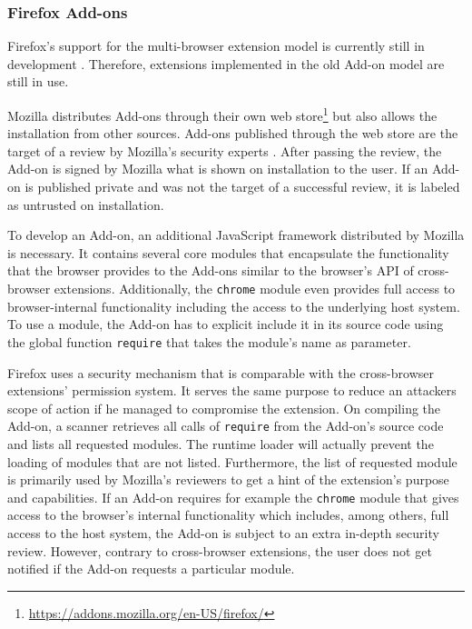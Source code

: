 \subsubsection{Firefox Add-ons}
	
	Firefox's support for the multi-browser extension model is currently still in development \cite{mozillaWebExtensionStatus}. Therefore, extensions implemented in the old Add-on model are still in use. 
	
	Mozilla distributes Add-ons through their own web store\footnote{\url{https://addons.mozilla.org/en-US/firefox/}} but also allows the installation from other sources. Add-ons published through the web store are the target of a review by Mozilla's security experts \cite{mozillaDevReviewPolicy}. After passing the review, the Add-on is signed by Mozilla what is shown on installation to the user. If an Add-on is published private and was not the target of a successful review, it is labeled as untrusted on installation. 
	
	To develop an Add-on, an additional JavaScript framework distributed by Mozilla is necessary. It contains several core modules that encapsulate the functionality that the browser provides to the Add-ons similar to the browser's API of cross-browser extensions. Additionally, the \texttt{chrome} module even provides full access to browser-internal functionality including the access to the underlying host system. To use a module, the Add-on has to explicit include it in its source code using the global function \texttt{require} that takes the module's name as parameter. 
	
	Firefox uses a security mechanism that is comparable with the cross-browser extensions' permission system. It serves the same purpose to reduce an attackers scope of action if he managed to compromise the extension. On compiling the Add-on, a scanner retrieves all calls of \texttt{require} from the Add-on's source code and lists all requested modules. The runtime loader will actually prevent the loading of modules that are not listed. Furthermore, the list of requested module is primarily used by Mozilla's reviewers to get a hint of the extension's purpose and capabilities. If an Add-on requires for example the \texttt{chrome} module that gives access to the browser's internal functionality which includes, among others, full access to the host system, the Add-on is subject to an extra in-depth security review. However, contrary to cross-browser extensions, the user does not get notified if the Add-on requests a particular module.
	
